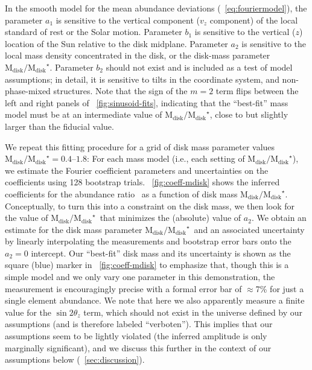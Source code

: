 \documentclass[modern]{aastex63}
\newcommand{\mdisk}{\ensuremath{\mathrm{M}_\mathrm{disk}}}
\newcommand{\mratio}{\ensuremath{\mdisk / \mdisk^\star}}
\begin{document}
In the smooth model for the mean abundance deviations
(\equationname~\ref{eq:fouriermodel}), the parameter $a_1$ is sensitive to the
vertical component ($v_z$ component) of the local standard of rest or the Solar
motion.
Parameter $b_1$ is sensitive to the vertical ($z$) location of the Sun relative
to the disk midplane.
Parameter $a_2$ is sensitive to the local mass density concentrated in the disk,
or the disk-mass parameter \mratio.
Parameter $b_2$ should not exist and is included as a test of model assumptions;
in detail, it is sensitive to tilts in the coordinate system, and
non-phase-mixed structures.
Note that the sign of the $m=2$ term flips between the left and right panels of
\figurename~\ref{fig:sinusoid-fits}, indicating that the ``best-fit'' mass model
must be at an intermediate value of $\mratio$, close to but slightly larger than
the fiducial value.

We repeat this fitting procedure for a grid of disk mass parameter values
$\mratio = 0.4$--$1.8$:
For each mass model (i.e., each setting of \mratio), we estimate the Fourier
coefficient parameters and uncertainties on the coefficients using 128 bootstrap
trials.
\figurename~\ref{fig:coeff-mdisk} shows the inferred coefficients for the
abundance ratio \mgfe\ as a function of disk mass \mratio.
Conceptually, to turn this into a constraint on the disk mass, we then look for
the value of \mratio\ that minimizes the (absolute) value of $a_2$.
We obtain an estimate for the disk mass parameter \mratio\ and an associated
uncertainty by linearly interpolating the measurements and bootstrap error bars
onto the $a_2=0$ intercept.
Our ``best-fit'' disk mass and its uncertainty is shown as the square (blue)
marker in \figurename~\ref{fig:coeff-mdisk} to emphasize that, though this is a
simple model and we only vary one parameter in this demonstration, the
measurement is encouragingly precise with a formal error bar of $\approx$7\% for
just a single element abundance.
We note that here we also apparently measure a finite value for the $\sin
2\theta_z$ term, which should not exist in the universe defined by our
assumptions (and is therefore labeled ``verboten'').
This implies that our assumptions seem to be lightly violated (the inferred
amplitude is only marginally significant), and we discuss this further in the
context of our assumptions below (\sectionname~\ref{sec:discussion}).
\end{document}
